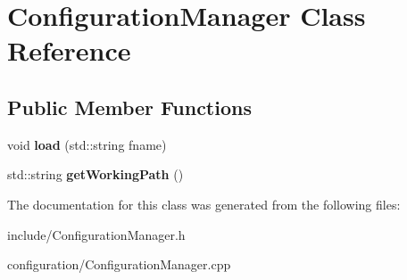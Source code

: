 \hypertarget{classConfigurationManager}{}\section{Configuration\+Manager Class Reference}
\label{classConfigurationManager}
\subsection*{Public Member Functions}
\begin{DoxyCompactItemize}
\item 
void {\bfseries load} (std\+::string fname)\hypertarget{classConfigurationManager_a066a7ae7e01b7ba6b62782fd3eeffaab}{}\label{classConfigurationManager_a066a7ae7e01b7ba6b62782fd3eeffaab}

\item 
std\+::string {\bfseries get\+Working\+Path} ()\hypertarget{classConfigurationManager_ab4fac4121f154fb83b67a727b650c436}{}\label{classConfigurationManager_ab4fac4121f154fb83b67a727b650c436}

\end{DoxyCompactItemize}


The documentation for this class was generated from the following files\+:\begin{DoxyCompactItemize}
\item 
include/Configuration\+Manager.\+h\item 
configuration/Configuration\+Manager.\+cpp\end{DoxyCompactItemize}
